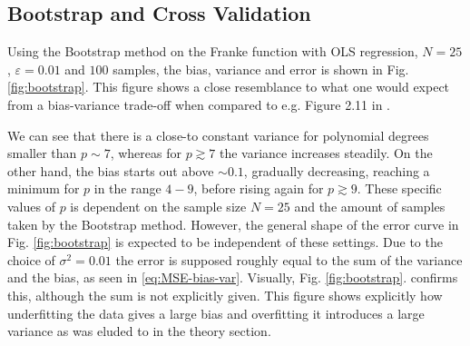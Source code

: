 \documentclass[%
reprint,
amsmath,amssymb,
aps,
pra,
]{revtex4-2}
\begin{document}
\subsection{Bootstrap and Cross Validation}
Using the Bootstrap method on the Franke function with OLS regression, $N=25$, $\varepsilon=0.01$ and \(100\) samples, the bias, variance and error is shown in Fig. \ref{fig:bootstrap}. This figure shows a close resemblance to what one would expect from a bias-variance trade-off when compared to e.g. Figure 2.11 in \cite{hastie01statisticallearning}. 

We can see that there is a close-to constant variance for polynomial degrees smaller than \(p\sim7\), whereas for \(p\gtrsim 7\) the variance increases steadily. On the other hand, the bias starts out above \(\sim0.1\), gradually decreasing, reaching a minimum for \(p\) in the range \(4-9\), before rising again for \(p\gtrsim 9\). These specific values of \(p\) is dependent on the sample size \(N=25\) and the amount of samples taken by the Bootstrap method. However, the general shape of the error curve in Fig. \ref{fig:bootstrap} is expected to be independent of these settings. Due to the choice of $\sigma^2=0.01$ the error is supposed roughly equal to the sum of the variance and the bias, as seen in \eqref{eq:MSE-bias-var}. Visually, Fig. \ref{fig:bootstrap}. confirms this, although the sum is not explicitly given. This figure shows explicitly how underfitting the data gives a large bias and overfitting it introduces a large variance as was eluded to in the theory section.
\end{document}
